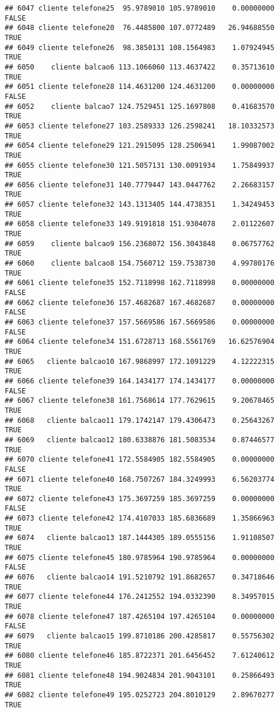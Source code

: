 \documentclass[
]{article}
\begin{document}
\begin{verbatim}
## 6047 cliente telefone25  95.9789010 105.9789010    0.00000000    FALSE
## 6048 cliente telefone20  76.4485800 107.0772489   26.94688550     TRUE
## 6049 cliente telefone26  98.3850131 108.1564983    1.07924945     TRUE
## 6050    cliente balcao6 113.1066060 113.4637422    0.35713610     TRUE
## 6051 cliente telefone28 114.4631200 124.4631200    0.00000000    FALSE
## 6052    cliente balcao7 124.7529451 125.1697808    0.41683570     TRUE
## 6053 cliente telefone27 103.2589333 126.2598241   18.10332573     TRUE
## 6054 cliente telefone29 121.2915095 128.2506941    1.99087002     TRUE
## 6055 cliente telefone30 121.5057131 130.0091934    1.75849937     TRUE
## 6056 cliente telefone31 140.7779447 143.0447762    2.26683157     TRUE
## 6057 cliente telefone32 143.1313405 144.4738351    1.34249453     TRUE
## 6058 cliente telefone33 149.9191818 151.9304078    2.01122607     TRUE
## 6059    cliente balcao9 156.2368072 156.3043848    0.06757762     TRUE
## 6060    cliente balcao8 154.7560712 159.7538730    4.99780176     TRUE
## 6061 cliente telefone35 152.7118998 162.7118998    0.00000000    FALSE
## 6062 cliente telefone36 157.4682687 167.4682687    0.00000000    FALSE
## 6063 cliente telefone37 157.5669586 167.5669586    0.00000000    FALSE
## 6064 cliente telefone34 151.6728713 168.5561769   16.62576904     TRUE
## 6065   cliente balcao10 167.9868997 172.1091229    4.12222315     TRUE
## 6066 cliente telefone39 164.1434177 174.1434177    0.00000000    FALSE
## 6067 cliente telefone38 161.7568614 177.7629615    9.20678465     TRUE
## 6068   cliente balcao11 179.1742147 179.4306473    0.25643267     TRUE
## 6069   cliente balcao12 180.6338876 181.5083534    0.87446577     TRUE
## 6070 cliente telefone41 172.5584905 182.5584905    0.00000000    FALSE
## 6071 cliente telefone40 168.7507267 184.3249993    6.56203774     TRUE
## 6072 cliente telefone43 175.3697259 185.3697259    0.00000000    FALSE
## 6073 cliente telefone42 174.4107033 185.6836689    1.35866963     TRUE
## 6074   cliente balcao13 187.1444305 189.0555156    1.91108507     TRUE
## 6075 cliente telefone45 180.9785964 190.9785964    0.00000000    FALSE
## 6076   cliente balcao14 191.5210792 191.8682657    0.34718646     TRUE
## 6077 cliente telefone44 176.2412552 194.0332390    8.34957015     TRUE
## 6078 cliente telefone47 187.4265104 197.4265104    0.00000000    FALSE
## 6079   cliente balcao15 199.8710186 200.4285817    0.55756302     TRUE
## 6080 cliente telefone46 185.8722371 201.6456452    7.61240612     TRUE
## 6081 cliente telefone48 194.9024834 201.9043101    0.25866493     TRUE
## 6082 cliente telefone49 195.0252723 204.8010129    2.89670277     TRUE

\end{verbatim}
\end{document}
